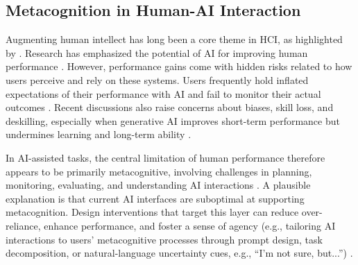 \documentclass[acmlarge,review=true, anonymous=true]{acmart}
\begin{document}
\subsection{Metacognition in Human-AI Interaction}

Augmenting human intellect has long been a core theme in HCI, as highlighted by \citet{engelbart1962augmenting}. Research has emphasized the potential of AI for improving human performance \cite{10.1145/3411764.3445717, steyvers_bayesian_2022,zulfikar_memoro_2024}.
However, performance gains come with hidden risks related to how users perceive and rely on these systems. Users frequently hold inflated expectations of their performance with AI and fail to monitor their actual outcomes \cite{FERNANDES2026108779, kloft2023ai, villa2023placebo, kosch2023placebo}. Recent discussions also raise concerns about biases, skill loss, and deskilling, especially when generative AI improves short-term performance but undermines learning and long-term ability \cite{bastani2024generative, rafner2022deskilling, Kobiella2024, stadler_cognitive_2024}.




In AI-assisted tasks, the central limitation of human performance therefore appears to be primarily metacognitive, involving challenges in planning, monitoring, evaluating, and understanding AI interactions \cite{tankelevitch2023metacognitive}. A plausible explanation is that current AI interfaces are suboptimal at supporting metacognition. Design interventions that target this layer can reduce over-reliance, enhance performance, and foster a sense of agency (e.g., tailoring AI interactions to users' metacognitive processes through prompt design, task decomposition, or natural-language uncertainty cues, e.g., ``I'm not sure, but...'') \cite{tankelevitch2023metacognitive, draxlerghost24, kim2024m}. 
\end{document}
